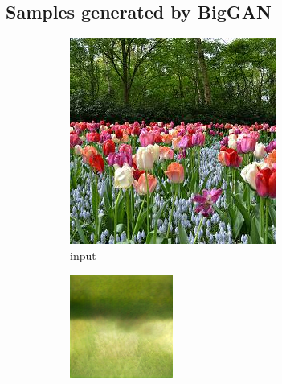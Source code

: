\documentclass{article}
\begin{document}
\newpage
\subsection*{Samples generated by BigGAN}
\begin{figure}[h!]
    \caption{Dataset Flower}
     \centering
     \begin{subfigure}[b]{0.24\textwidth}
         \centering
         \includegraphics[width=\textwidth]{illustration/flower_input.jpeg}
         \caption{input}
     \end{subfigure}
     \begin{subfigure}[b]{0.24\textwidth}
         \centering
         \includegraphics[width=\textwidth]{illustration/flower_biggan_500.png}

\end{subfigure}
\end{figure}
\end{document}
